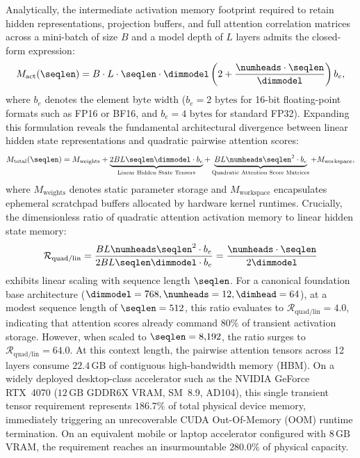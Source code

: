 Analytically, the intermediate activation memory footprint required to retain hidden representations, projection buffers, and full attention correlation matrices across a mini-batch of size $B$ and a model depth of $L$ layers admits the closed-form expression:
\begin{equation}
\label{eq:activation_memory_closed_form}
M_{\text{act}}(\seqlen) = B \cdot L \cdot \seqlen \cdot \dimmodel \left( 2 + \frac{\numheads \cdot \seqlen}{\dimmodel} \right) b_e,
\end{equation}
where $b_e$ denotes the element byte width ($b_e = 2\text{ bytes}$ for 16-bit floating-point formats such as FP16 or BF16, and $b_e = 4\text{ bytes}$ for standard FP32).
Expanding this formulation reveals the fundamental architectural divergence between linear hidden state representations and quadratic pairwise attention scores:
\begin{equation}
\label{eq:memory_breakdown_full}
M_{\text{total}}(\seqlen) = M_{\text{weights}} + \underbrace{2 B L \seqlen \dimmodel \cdot b_e}_{\text{Linear Hidden State Tensors}} + \underbrace{B L \numheads \seqlen^2 \cdot b_e}_{\text{Quadratic Attention Score Matrices}} + M_{\text{workspace}},
\end{equation}
where $M_{\text{weights}}$ denotes static parameter storage and $M_{\text{workspace}}$ encapsulates ephemeral scratchpad buffers allocated by hardware kernel runtimes.
Crucially, the dimensionless ratio of quadratic attention activation memory to linear hidden state memory:
\begin{equation}
\label{eq:ratio_quad_lin}
\mathcal{R}_{\text{quad/lin}} = \frac{B L \numheads \seqlen^2 \cdot b_e}{2 B L \seqlen \dimmodel \cdot b_e} = \frac{\numheads \cdot \seqlen}{2\dimmodel}
\end{equation}
exhibits linear scaling with sequence length $\seqlen$.
For a canonical foundation base architecture ($\dimmodel = 768, \numheads = 12, \dimhead = 64$), at a modest sequence length of $\seqlen = 512$, this ratio evaluates to $\mathcal{R}_{\text{quad/lin}} = 4.0$, indicating that attention scores already command $80\%$ of transient activation storage.
However, when scaled to $\seqlen = 8{,}192$, the ratio surges to $\mathcal{R}_{\text{quad/lin}} = 64.0$.
At this context length, the pairwise attention tensors across 12 layers consume $22.4\,\text{GB}$ of contiguous high-bandwidth memory (HBM).
On a widely deployed desktop-class accelerator such as the NVIDIA GeForce RTX~4070 ($12\,\text{GB}$ GDDR6X VRAM, SM~8.9, AD104), this single transient tensor requirement represents $186.7\%$ of total physical device memory, immediately triggering an unrecoverable CUDA Out-Of-Memory (OOM) runtime termination.
On an equivalent mobile or laptop accelerator configured with $8\,\text{GB}$ VRAM, the requirement reaches an insurmountable $280.0\%$ of physical capacity.

